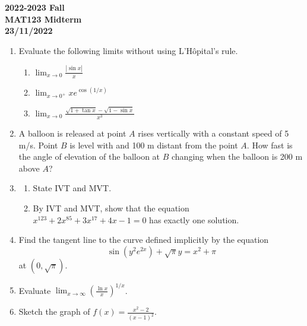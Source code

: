 \documentclass[a4paper, 12pt]{article}
\renewcommand{\headrulewidth}{0pt}
\begin{document}
\pagestyle{empty}

\begin{center}
\textbf{2022-2023 Fall\\MAT123 Midterm\\23/11/2022}
\end{center}

\begin{enumerate}[leftmargin=*,label=\textbf{\arabic*.}]
\item Evaluate the following limits without using L'Hôpital's rule.

\begin{enumerate}[leftmargin=*,label=\textbf{\alph*.}]
\item $\displaystyle \lim_{x\to 0} \frac{\left|\sin x\right|}{x}$
\item $\displaystyle \lim_{x\to 0^+}x e^{\displaystyle \cos(1/x)}$
\item $\displaystyle \lim_{x\to 0}{\frac{\sqrt{1+\tan x} -\sqrt{1-\sin x} }{x^3}}$
\end{enumerate}

\item A balloon is released at point $A$ rises vertically with a constant speed of 5 m/s. Point $B$ is level with and 100 m distant from the point $A$. How fast is the angle of elevation of the balloon at $B$ changing when the balloon is 200 m above $A$?

\item
\begin{enumerate}[leftmargin=*,label=\textbf{\alph*.}]
\item State IVT and MVT.

\item By IVT and MVT, show that the equation $x^{123}+2x^{85} + 3x^{17} + 4x-1 = 0$ has exactly one solution.
\end{enumerate}

\item Find the tangent line to the curve defined implicitly by the equation
\[\sin\left(y^2 e^{2x}\right)+\sqrt{\pi}y=x^2+\pi\]
at $\left(0, \sqrt\pi\right).$

\item Evaluate $\displaystyle \lim_{x \to \infty} \left(\frac{\ln x}{x}\right)^{1/x}$.

\item Sketch the graph of $\displaystyle f(x) = \frac{x^2-2}{(x-1)^2}$.
\end{enumerate}

\newpage
\pagestyle{fancy}
\renewcommand{\headrulewidth}{1pt}
\end{document}
